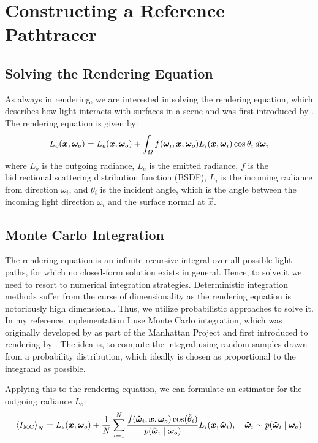 
\chapter{Constructing a Reference Pathtracer}
\label{chap:pathtracing}

\section{Solving the Rendering Equation}

As always in rendering, we are interested in solving the rendering equation, which describes how light interacts with surfaces in a scene and was first introduced by \textcite{kajiya1986}.
The rendering equation is given by:
\begin{equation}
\label{eq:rendering_equation}
    L_o(\bm{x}, {\bm{\omega}_o}) = L_e(\bm{x}, {\bm{\omega}_o}) + \int_{\Omega} f({\bm{\omega}_i}, \bm{x}, {\bm{\omega}_o}) L_i(\bm{x}, {\bm{\omega}_i}) \cos\theta_i \mathop{}\!d{\bm{\omega}_i}
\end{equation}
where $L_o$ is the outgoing radiance, $L_e$ is the emitted radiance, $f$ is the bidirectional scattering distribution function (BSDF), $L_i$ is the incoming radiance from direction $\omega_i$, and $\theta_i$ is the incident angle, which is the angle between the incoming light direction $\omega_i$ and the surface normal at $\vec{x}$.

\section{Monte Carlo Integration}

The rendering equation is an infinite recursive integral over all possible light paths, for which no closed-form solution exists in general.
Hence, to solve it we need to resort to numerical integration strategies.
Deterministic integration methods suffer from the curse of dimensionality as the rendering equation is notoriously high dimensional.
Thus, we utilize probabilistic approaches to solve it.
In my reference implementation I use Monte Carlo integration, which was originally developed by \textcite{metropolis1949} as part of the Manhattan Project and first introduced to rendering by \textcite{kajiya1986}.
The idea is, to compute the integral using random samples drawn from a probability distribution, which ideally is chosen as proportional to the integrand as possible.

Applying this to the rendering equation, we can formulate an estimator for the outgoing radiance $L_o$:
\begin{equation}
    \estimator{I_\mathrm{MC}} = L_e(\vec{x}, \wo) + \frac{1}{N} \sum_{i=1}^{N} \frac{f(\vec{\hat{\omega}}_i, \vec{x}, \wo) \cos(\hat{\theta}_i)}{p(\vec{\hat{\omega}}_i \mid \wo)} L_i(\vec{x}, \vec{\hat{\omega}}_i), \quad \vec{\hat{\omega}}_i \sim p(\vec{\hat{\omega}}_i \mid \wo)
\end{equation}

